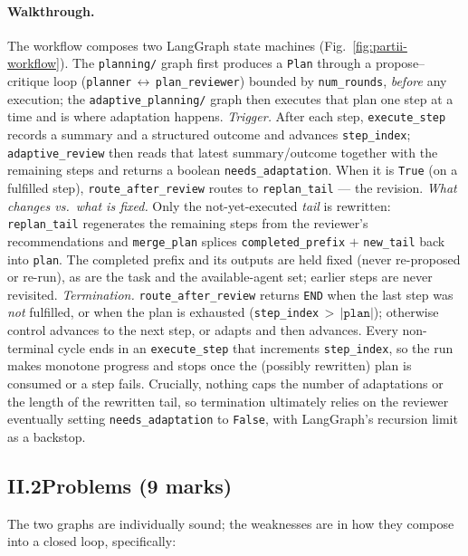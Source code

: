 \documentclass[11pt,a4paper]{article}
\begin{document}
\paragraph{Walkthrough.}
The workflow composes two LangGraph state machines (Fig.~\ref{fig:partii-workflow}). The
\texttt{planning/} graph first produces a \texttt{Plan} through a propose--critique loop
(\texttt{planner}\,$\leftrightarrow$\,\texttt{plan\_reviewer}) bounded by \texttt{num\_rounds}, \emph{before}
any execution; the \texttt{adaptive\_planning/} graph then executes that plan one step at a time and is
where adaptation happens.
\emph{Trigger.} After each step, \texttt{execute\_step} records a summary and a structured outcome and
advances \texttt{step\_index}; \texttt{adaptive\_review} then reads that latest summary/outcome together
with the remaining steps and returns a boolean \texttt{needs\_adaptation}. When it is \texttt{True}
(on a fulfilled step), \texttt{route\_after\_review} routes to \texttt{replan\_tail} --- the revision.
\emph{What changes vs.\ what is fixed.} Only the not-yet-executed \emph{tail} is rewritten:
\texttt{replan\_tail} regenerates the remaining steps from the reviewer's recommendations and
\texttt{merge\_plan} splices \texttt{completed\_prefix} $+$ \texttt{new\_tail} back into \texttt{plan}.
The completed prefix and its outputs are held fixed (never re-proposed or re-run), as are the task and
the available-agent set; earlier steps are never revisited.
\emph{Termination.} \texttt{route\_after\_review} returns \texttt{END} when the last step was \emph{not}
fulfilled, or when the plan is exhausted (\texttt{step\_index}\,$>$\,$|\texttt{plan}|$); otherwise control
advances to the next step, or adapts and then advances. Every non-terminal cycle ends in an
\texttt{execute\_step} that increments \texttt{step\_index}, so the run makes monotone progress and stops
once the (possibly rewritten) plan is consumed or a step fails. Crucially, nothing caps the number of
adaptations or the length of the rewritten tail, so termination ultimately relies on the reviewer
eventually setting \texttt{needs\_adaptation} to \texttt{False}, with LangGraph's recursion limit as a
backstop.

\subsection*{II.2\quad Problems (9 marks)}
\label{sec:partii-problems}
The two graphs are individually sound; the weaknesses are in how they compose into a closed loop, specifically:
\end{document}
